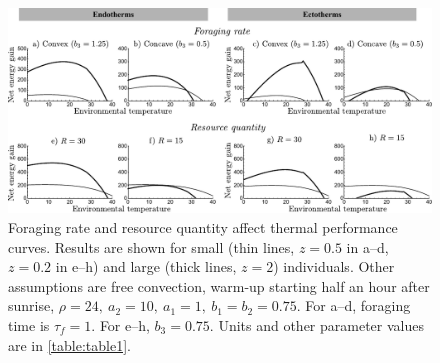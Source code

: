 \clearpage

\begin{figure}
\includegraphics[width=\textwidth]{fig5}
\caption{
    \setstretch{\stretchby}
	Foraging rate and resource quantity affect thermal performance curves.
	Results are shown for small (thin lines, $z = 0.5$ in a--d, $z = 0.2$ in e--h) and large (thick lines, $z = 2$) individuals.
	Other assumptions are free convection, warm-up starting half an hour after sunrise, $\rho = 24,\ a_2 = 10, \ a_1 = 1, \ b_1 = b_2 = 0.75 $.
    For a--d, foraging time is $\tau_f = 1$.
    For e--h, $b_3 = 0.75$.
    Units and other parameter values are in \cref{table:table1}.
}
\label{fig5}
\end{figure}
